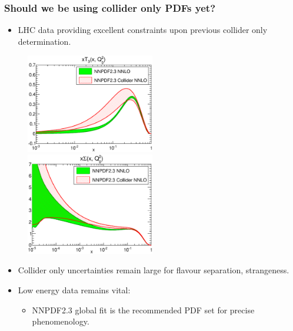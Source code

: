 \documentclass[10pt]{beamer}
\begin{document}
\begin{frame}
\frametitle{Should we be using collider only PDFs yet?}

\begin{itemize}
\item<1-> LHC data providing excellent constraints upon previous collider only determination.
\end{itemize}

 \begin{figure}[b!]
    \begin{center}
      \includegraphics[width=0.50\textwidth]{xT3_Q_2_log-23-vs-23coll-nnlo.eps}
      \includegraphics[width=0.50\textwidth]{xSinglet_Q_2_log-23-vs-23coll-nnlo}
    \end{center}
    \vskip-0.5cm
    \label{fig:pdf-jets}
\end{figure}
\vskip10pt

\begin{itemize}
\item<1-> Collider only uncertainties remain large for flavour separation, strangeness.
\item<1-> Low energy data remains vital:
\begin{itemize}
\item<1-> NNPDF2.3 global fit is the recommended PDF set for precise phenomenology.
\end{itemize}

\end{itemize}

\end{frame}
\end{document}
